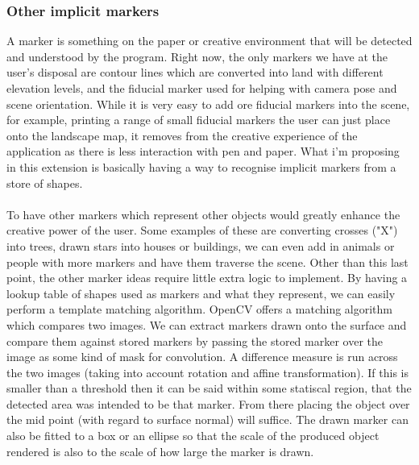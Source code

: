 \documentclass[11pt]{article}
\begin{document}
\subsubsection{Other implicit markers}
A marker is something on the paper or creative environment that will be 
detected and understood by the program. Right now, the only markers we have
at the user's disposal are contour lines which are converted into land with
different elevation levels, and the fiducial marker used for helping
with camera pose and scene orientation. While it is very easy to add 
ore fiducial markers into the scene, for example, printing a range of 
small fiducial markers the user can just place onto the landscape map, 				
it removes from the creative experience of the application
as there is less interaction with pen and paper. What i'm proposing in
this extension is basically having a way to recognise implicit markers
from a store of shapes.\\
\\
To have other markers which represent other objects would greatly enhance the
creative power of the user. Some examples of these are converting crosses ("X")
into trees, drawn stars into houses or buildings, we can even add in animals 
or people with more markers and have them traverse the scene. Other than this
last point, the other marker ideas require little extra logic to implement.
By having a lookup table of shapes used as markers and what they represent, we
can easily perform a template matching algorithm. OpenCV offers a matching
algorithm which compares two images. We can extract markers drawn onto the
surface and compare them against stored markers by passing the stored marker
over the image as some kind of mask for convolution. A difference measure is run
across the two images (taking into account rotation and affine transformation).
If this is smaller than a threshold then it can be said within some statiscal
region, that the detected area was intended to be that marker. From there placing
the object over the mid point (with regard to surface normal) will suffice. 
The drawn marker can also be fitted to a box or an ellipse so that the
scale of the produced object rendered is also to the scale of how 
large the marker is drawn.
\end{document}
